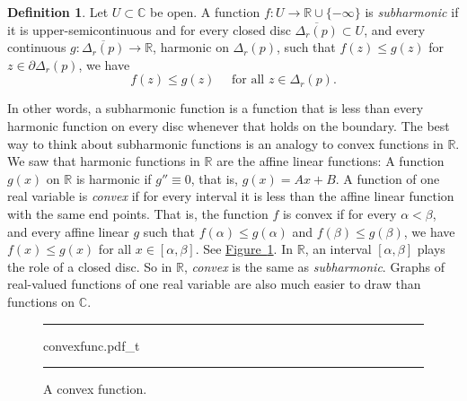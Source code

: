 \documentclass[12pt,openany]{book}
\newcommand{\C}{{\mathbb{C}}}
\newcommand{\R}{{\mathbb{R}}}
\newcommand{\myindex}[1]{#1\index{#1}}
\theoremstyle{plain}
\theoremstyle{remark}
\theoremstyle{definition}
\newtheorem{defn}[thm]{Definition}
\newenvironment{myfig}{%
\begin{figure}[h!t]
\noindent\rule{\textwidth}{0.5pt}\vspace{12pt}\par\centering}%
{\par\noindent\rule{\textwidth}{0.5pt}
\end{figure}}
\theoremstyle{exercise}
\theoremstyle{example}
\newcommand{\figureref}[1]{\hyperref[#1]{Figure~\ref*{#1}}}
\begin{document}
\begin{defn}
Let $U \subset \C$ be open.
A function $f \colon U \to \R \cup \{ -\infty \}$ is 
\emph{\myindex{subharmonic}} if it is upper-semicontinuous
and for every closed disc $\overline{\Delta_r(p)} \subset U$,
and every continuous $g \colon \overline{\Delta_r(p)} \to \R$,
harmonic on $\Delta_r(p)$,
such that $f(z) \leq g(z)$ for $z \in \partial \Delta_r(p)$, we have
\begin{equation*}
f(z) \leq g(z) \quad \text{ for all } z \in \Delta_r(p) .
\end{equation*}
\end{defn}

In other words, a subharmonic function is a function that is less than every
harmonic function on every disc whenever that holds on the boundary.
The best way to think about subharmonic functions is an analogy to convex
functions in $\R$.
We saw that harmonic functions in $\R$ are the affine linear functions:
A function $g(x)$ on $\R$ is harmonic if $g'' \equiv 0$, that is, $g(x) = Ax+B$.
A function of one real variable is
\emph{convex} if 
for every interval it is less than the affine linear function with the same
end points.
That is,
the function $f$ is convex if for every $\alpha < \beta$,
and every affine linear $g$ such that
$f(\alpha) \leq g(\alpha)$
and
$f(\beta) \leq g(\beta)$,
we have
$f(x) \leq g(x)$ for all $x \in [\alpha,\beta]$.
See \figureref{fig:convexfunc}.
In $\R$, an interval $[\alpha,\beta]$ plays the role of a closed disc.
So in $\R$, \emph{convex} is the same as \emph{subharmonic}.
Graphs of real-valued functions of one real variable
are also much easier to draw than functions on $\C$.

\begin{myfig}
{convexfunc.pdf_t}
\caption{A convex function.\label{fig:convexfunc}}
\end{myfig}
\end{document}
